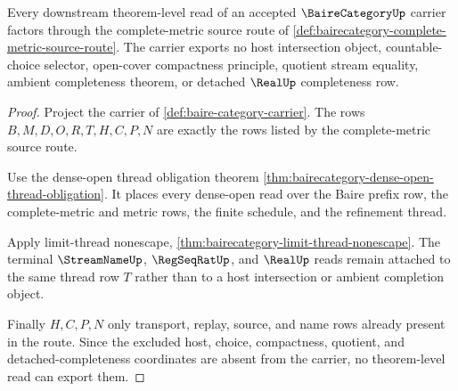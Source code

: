 \begin{theorem}
\label{thm:bairecategory-source-route-nonescape}
Every downstream theorem-level read of an accepted $\BaireCategoryUp$ carrier factors through the complete-metric source route of \autoref{def:bairecategory-complete-metric-source-route}. The carrier exports no host intersection object, countable-choice selector, open-cover compactness principle, quotient stream equality, ambient completeness theorem, or detached $\RealUp$ completeness row.
\end{theorem}
\begin{proof}
Project the carrier of \autoref{def:baire-category-carrier}. The rows $B,M,D,O,R,T,H,C,P,N$ are exactly the rows listed by the complete-metric source route.

Use the dense-open thread obligation theorem \autoref{thm:bairecategory-dense-open-thread-obligation}. It places every dense-open read over the Baire prefix row, the complete-metric and metric rows, the finite schedule, and the refinement thread.

Apply limit-thread nonescape, \autoref{thm:bairecategory-limit-thread-nonescape}. The terminal $\StreamNameUp$, $\RegSeqRatUp$, and $\RealUp$ reads remain attached to the same thread row $T$ rather than to a host intersection or ambient completion object.

Finally $H,C,P,N$ only transport, replay, source, and name rows already present in the route. Since the excluded host, choice, compactness, quotient, and detached-completeness coordinates are absent from the carrier, no theorem-level read can export them.
\end{proof}

